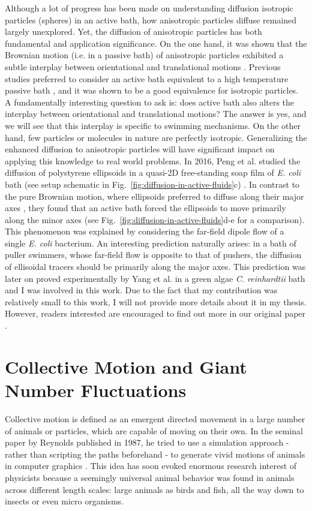 Although a lot of progress has been made on understanding diffusion isotropic particles (spheres) in an active bath, how anisotropic particles diffuse remained largely unexplored. Yet, the diffusion of anisotropic particles has both fundamental and application significance. On the one hand, it was shown that the Brownian motion (i.e. in a passive bath) of anisotropic particles exhibited a subtle interplay between orientational and translational motions \cite{Han2006}. Previous studies preferred to consider an active bath equivalent to a high temperature passive bath \cite{Wu2000}, and it was shown to be a good equivalence for isotropic particles. A fundamentally interesting question to ask is: does active bath also alters the interplay between orientational and translational motions? The answer is yes, and we will see that this interplay is specific to swimming mechanisms. On the other hand, few particles or molecules in nature are perfectly isotropic. Generalizing the enhanced diffusion to anisotropic particles will have significant impact on applying this knowledge to real world problems. In 2016, Peng et al. studied the diffusion of polystyrene ellipsoids in a quasi-2D free-standing soap film of \textit{E. coli} bath (see setup schematic in Fig.~\ref{fig:diffusion-in-active-fluids}c) \cite{Peng2016}. In contrast to the pure Brownian motion, where ellipsoids preferred to diffuse along their major axes \cite{Han2006}, they found that an active bath forced
the ellipsoids to move primarily along the minor axes (see Fig.~\ref{fig:diffusion-in-active-fluids}d-e for a comparison). This phenomenon was explained by considering the far-field dipole flow of a single \textit{E. coli} bacterium. An interesting prediction naturally arises: in a bath of puller swimmers, whose far-field flow is opposite to that of pushers, the diffusion of ellisoidal tracers should be primarily along the major axes. This prediction was later on proved experimentally by Yang et al. \cite{Yang2016} in a green algae \textit{C. reinhardtii} bath and I was involved in this work. Due to the fact that my contribution was relatively small to this work, I will not provide more details about it in my thesis. However, readers interested are encouraged to find out more in our original paper \cite{Yang2016}.





\section{Collective Motion and Giant Number Fluctuations}
Collective motion is defined as an emergent directed movement in a large number of animals or particles, which are capable of moving on their own. In the seminal paper by Reynolds published in 1987, he tried to use a simulation approach - rather than scripting the paths beforehand - to generate vivid motions of animals in computer graphics \cite{Reynolds1987}. This idea has soon evoked enormous research interest of physicists because a seemingly universal animal behavior was found in animals across different length scales: large animals as birds and fish, all the way down to insects or even micro organisms.

